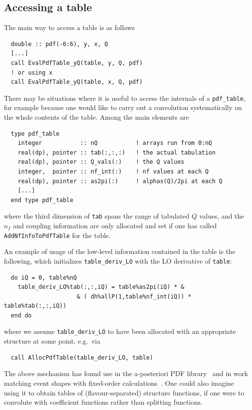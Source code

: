 \documentclass[12pt]{article}
\newcommand{\eg}{e.g.\ }
\newcommand{\ttt}[1]{\texttt{#1}}
\begin{document}
\subsection{Accessing a table}

The main way to access a table is as follows
\begin{verbatim}
  double :: pdf(-6:6), y, x, Q
  [...]
  call EvalPdfTable_yQ(table, y, Q, pdf)
  ! or using x
  call EvalPdfTable_yQ(table, x, Q, pdf)
\end{verbatim}
There may be situations where it is useful to access the internals of
a \ttt{pdf\_table}, for example because one would like to carry out a
convolution systematically on the whole contents of the table. Among
the main elements are
\begin{verbatim}
  type pdf_table
    integer           :: nQ           ! arrays run from 0:nQ
    real(dp), pointer :: tab(:,:,:)   ! the actual tabulation
    real(dp), pointer :: Q_vals(:)    ! the Q values 
    integer,  pointer :: nf_int(:)    ! nf values at each Q
    real(dp), pointer :: as2pi(:)     ! alphas(Q)/2pi at each Q
    [...]
  end type pdf_table
\end{verbatim}
where the third dimension of \ttt{tab} spans the range of tabulated
$Q$ values, and the $n_f$ and coupling information are only allocated
and set if one has called \ttt{AddNfInfoToPdfTable} for the table.


An example of usage of the low-level information contained in the
table is the following, which initializes \ttt{table\_deriv\_LO} with
the LO derivative of \ttt{table}:
\begin{verbatim}
  do iQ = 0, table%nQ
    table_deriv_LO%tab(:,:,iQ) = table%as2pi(iQ) * &
                     & ( dh%allP(1,table%nf_int(iQ)) * table%tab(:,:,iQ))
  end do
\end{verbatim}
where we assume \ttt{table\_deriv\_LO} to have been allocated with an
appropriate structure at some point, \eg via 
\begin{verbatim}
  call AllocPdfTable(table_deriv_LO, table)
\end{verbatim}
The above mechanism has found use in the a-posteriori PDF
library~\cite{APPL} and in work matching event shapes with fixed-order
calculations~\cite{caesar,DisResum}.
%
One could also imagine using it to obtain tables of
(flavour-separated) structure functions, if one were to convolute with
coefficient functions rather than splitting functions.
\end{document}
